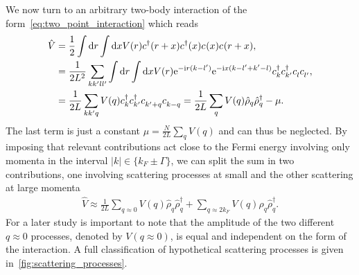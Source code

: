 We now turn to an arbitrary two-body interaction of the form~\cref{eq:two_point_interaction} which reads
\begin{align}
    \hat V
    &= \frac12\int\rd r\int\rd x V(r)c^\dag(r+x)c^\dag(x)c^\pdag(x)c^\pdag(r+x),
    \\
    &= \frac1{2L^2}\sum_{kk'll'}\int\rd r\int\rd x V(r)\re^{-\ri r(k-l')}\re^{-\ri x(k-l'+k'-l)}c^\dag_kc^\dag_{k'}c^\pdag_lc^\pdag_{l'},
    \\
    &= \frac1{2L}\sum_{kk'q}V(q)c^\dag_kc^\dag_{k'}c^\pdag_{k'+q}c^\pdag_{k-q}
    = \frac1{2L}\sum_{q}V(q)\hat\rho_q\hat\rho^\dag_{q} - \mu.
    \label{eq:two_body_interaction_momentum_space}
\end{align}
The last term is just a constant $\mu = \frac N{2L}\sum_qV(q)$ and can thus be neglected.
By imposing that relevant contributions act close to the Fermi energy involving only momenta in the interval $|k|\in\{k_F\pm\Gamma\}$, we can split the sum in two contributions, one involving scattering processes at small and the other scattering at large momenta
\begin{align}
    \hat V \approx \frac1{2L}\sum_{q\approx0}V(q)\hat\rho_{q}\hat\rho^\dag_{q} + \sum_{q\approx2k_F}V(q)\hat\rho_{q}\hat\rho^\dag_{q}.
\end{align}
For a later study is important to note that the amplitude of the two different $q\approx0$ processes, denoted by $V(q\approx0)$, is equal and independent on the form of the interaction.
A full classification of hypothetical scattering processes is given in~\cref{fig:scattering_processes}.
